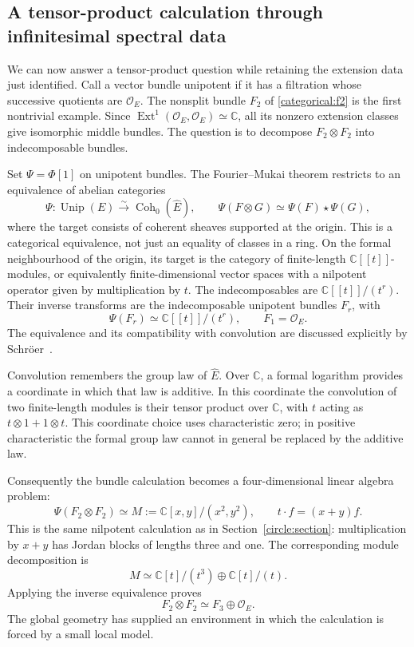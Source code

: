 \documentclass[11pt]{article}
\theoremstyle{remark}
\newcommand{\C}{\mathbb C}
\begin{document}
\subsection{A tensor-product calculation through infinitesimal spectral data}

We can now answer a tensor-product question while retaining the extension data just identified. Call a vector bundle unipotent if it has a filtration whose successive quotients are \(\mathcal O_E\). The nonsplit bundle \(F_2\) of \eqref{categorical:f2} is the first nontrivial example.
Since \(\operatorname{Ext}^1(\mathcal O_E,\mathcal O_E)\simeq\mathbb C\), all its nonzero extension classes give isomorphic middle bundles. The question is to decompose \(F_2\otimes F_2\) into indecomposable bundles.

Set \(\Psi=\Phi[1]\) on unipotent bundles. The Fourier--Mukai theorem restricts to an equivalence of abelian categories
\begin{equation}
\Psi:\operatorname{Unip}(E)
\overset{\sim}{\longrightarrow}
\operatorname{Coh}_0(\widehat E),
\qquad
\Psi(F\otimes G)\simeq\Psi(F)\star\Psi(G),
\label{categorical:unipotent}
\end{equation}
where the target consists of coherent sheaves supported at the origin. This is a categorical equivalence, not just an equality of classes in a ring. On the formal neighbourhood of the origin, its target is the category of finite-length \(\mathbb C[[t]]\)-modules, or equivalently finite-dimensional vector spaces with a nilpotent operator given by multiplication by \(t\). The indecomposables are \(\mathbb C[[t]]/(t^r)\). Their inverse transforms are the indecomposable unipotent bundles \(F_r\), with
\begin{equation}
\Psi(F_r)\simeq\mathbb C[[t]]/(t^r),
\qquad F_1=\mathcal O_E.
\label{categorical:fr}
\end{equation}
The equivalence and its compatibility with convolution are discussed explicitly by Schr\"oer~\cite{schroer}.

Convolution remembers the group law of \(\widehat E\). Over \(\mathbb C\), a formal logarithm provides a coordinate in which that law is additive. In this coordinate the convolution of two finite-length modules is their tensor product over \(\mathbb C\), with \(t\) acting as \(t\otimes1+1\otimes t\). This coordinate choice uses characteristic zero; in positive characteristic the formal group law cannot in general be replaced by the additive law.

Consequently the bundle calculation becomes a four-dimensional linear algebra problem:
\[
\Psi(F_2\otimes F_2)
\simeq M:=\mathbb C[x,y]/(x^2,y^2),
\qquad t\cdot f=(x+y)f.
\]
This is the same nilpotent calculation as in Section~\ref{circle:section}: multiplication by \(x+y\) has Jordan blocks of lengths three and one. The corresponding module decomposition is
\[
M\simeq\C[t]/(t^3)\oplus\C[t]/(t).
\]
Applying the inverse equivalence proves
\begin{equation}
\boxed{F_2\otimes F_2\simeq F_3\oplus\mathcal O_E.}
\label{categorical:f2-product}
\end{equation}
The global geometry has supplied an environment in which the calculation is forced by a small local model.
\end{document}
